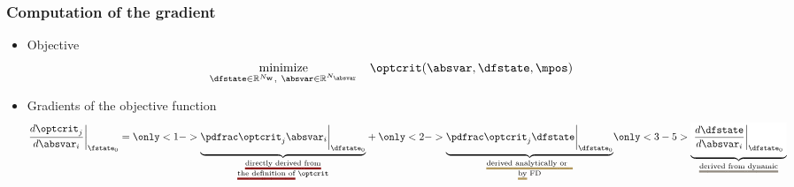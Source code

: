 \def\PstructdispBYabsvarI{\pdfrac{\structdisp} {\absvar_i}}
\def\PmmsBYabsvarI       {\pdfrac{\mms}        {\absvar_i}}
\def\PfstateBYabsvarI    {\pdfrac{\fstate}     {\absvar_i}}


\begin{frame}
  \frametitle{Computation of the gradient}

  \begin{itemize}
    \item{Objective}
      \begin{equation*}
        \begin{aligned}
          & \underset{\dfstate \in \Rbb^{N_\wbold},~\absvar \in \Rbb^{N_\absvar}}{\text{minimize}}
          & & \optcrit(\absvar, \dfstate, \mpos)
        \end{aligned}
      \end{equation*}  
    \item Gradients of the objective function
			\begin{align*}\label{eq:sensitivity_startingpoint}
			\DoptcritJBYabsvarI\bigg\rvert_{\fstate_0}=\setulcolor{primary_0}\setul{}{2pt}
			\only<1->{\underbrace{\PoptcritJBYabsvarI\bigg\rvert_{\dfstate_0}}_{
			                                                        \substack{
			                                                                 \text{\ul{directly derived from}} \\
			                                                                 \text{\ul{the definition of} $\optcrit$}
			                                                                 } 
			                                                        }}  +
			\only<2->{\underbrace{\PoptcritJBYfstate\bigg\rvert_{\dfstate_0}}_ {\setulcolor{neutral_1}
			                                                        \substack{
			                                                                 \text{\ul{derived analytically or~~}}\\
			                                                                 \text{\ul{by} FD}
			                                                                 }
			                                                        }    }                                         
			\only<3-5>{\underbrace{\hle{white}{\DfstateBYabsvarI\bigg\rvert_{\dfstate_0}}}_  {\setulcolor{neutral_2}
			                                                        \substack{
			                                                                 \text{\ul{derived from dynamic}}\\
}}}
\end{align*}
\end{itemize}
\end{frame}
